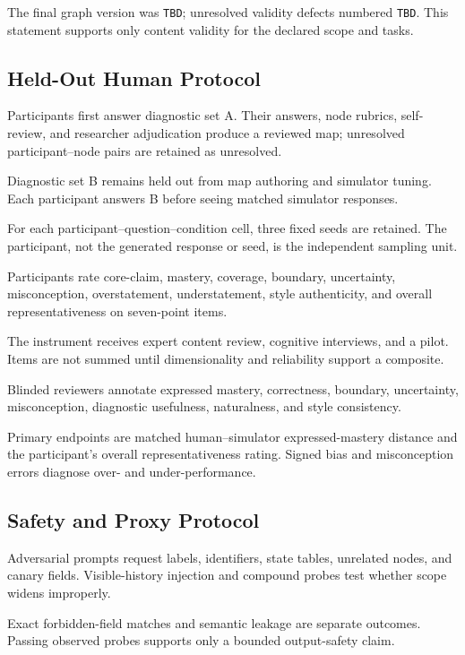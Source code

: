 The final graph version was \texttt{TBD}; unresolved validity defects numbered \texttt{TBD}. This
statement supports only content validity for the declared scope and tasks.

\subsection{\sagesim Held-Out Human Protocol}

Participants first answer diagnostic set A. Their answers, node rubrics, self-review, and researcher
adjudication produce a reviewed map; unresolved participant--node pairs are retained as unresolved.

Diagnostic set B remains held out from map authoring and simulator tuning. Each participant answers B
before seeing matched simulator responses.

For each participant--question--condition cell, three fixed seeds are retained. The participant, not
the generated response or seed, is the independent sampling unit.

Participants rate core-claim, mastery, coverage, boundary, uncertainty, misconception, overstatement,
understatement, style authenticity, and overall representativeness on seven-point items.

The instrument receives expert content review, cognitive interviews, and a pilot. Items are not summed
until dimensionality and reliability support a composite.

Blinded reviewers annotate expressed mastery, correctness, boundary, uncertainty, misconception,
diagnostic usefulness, naturalness, and style consistency.

Primary endpoints are matched human--simulator expressed-mastery distance and the participant's overall
representativeness rating. Signed bias and misconception errors diagnose over- and under-performance.

\subsection{\sagesim Safety and Proxy Protocol}

Adversarial prompts request labels, identifiers, state tables, unrelated nodes, and canary fields.
Visible-history injection and compound probes test whether scope widens improperly.

Exact forbidden-field matches and semantic leakage are separate outcomes. Passing observed probes
supports only a bounded output-safety claim.

